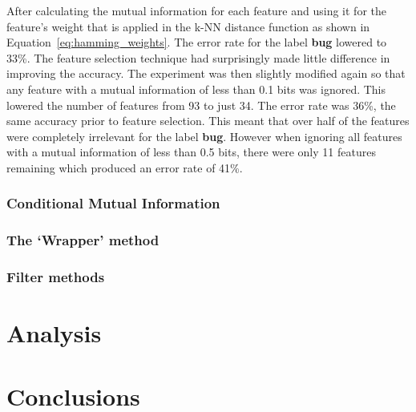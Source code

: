 After calculating the mutual information for each feature and using it for the feature's weight that is applied in the k-NN
distance function as shown in Equation~\ref{eq:hamming_weights}. The error rate for the label \textbf{bug} lowered to 33\%. The
feature selection technique had surprisingly made little difference in improving the accuracy. The experiment was then slightly
modified again so that any feature with a mutual information of less than 0.1 bits was ignored. This lowered the number of
features from 93 to just 34. The error rate was 36\%, the same accuracy prior to feature selection. This meant that over half of
the features were completely irrelevant for the label \textbf{bug}. However when ignoring all features with a mutual information
of less than 0.5 bits, there were only 11 features remaining which produced an error rate of 41\%.

\subsubsection{Conditional Mutual Information}
\todo{}
\cite{fast_binary_feature_selection}

\subsubsection{The `Wrapper' method}
\todo{}

\subsubsection{Filter methods}
\todo{}

\section{Analysis}
\todo{}
\cite{stability_feature_ranking}
\cite{redundant_feature_elimination}

\cite{mltechniques_spamfiltering}
\cite{mlmethods_spamfiltering}

\section{Conclusions}
\todo{}

% 
% 
% 
% 
% 